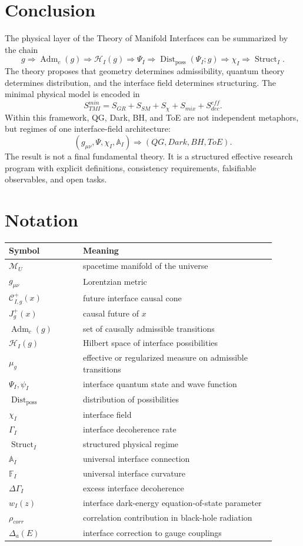 \documentclass[12pt,a4paper]{article}
\DeclareMathOperator{\Adm}{Adm}
\DeclareMathOperator{\Struct}{Struct}
\DeclareMathOperator{\Dist}{Dist}
\newcommand{\M}{\mathcal M_U}
\newcommand{\Hilb}{\mathcal H}
\newcommand{\Acal}{\mathbb A_I}
\newcommand{\Fcal}{\mathbb F_I}
\begin{document}
\section{Conclusion}
The physical layer of the Theory of Manifold Interfaces can be summarized by the chain
\[
\boxed{
g\Rightarrow\Adm_c(g)\Rightarrow\Hilb_I(g)\Rightarrow\Psi_I
\Rightarrow\Dist_{\mathrm{poss}}(\Psi_I;g)
\Rightarrow\chi_I\Rightarrow\Struct_I.
}
\]
The theory proposes that geometry determines admissibility, quantum theory determines distribution, and the interface field determines structuring. The minimal physical model is encoded in
\[
\boxed{
S_{TMI}^{min}=S_{GR}+S_{SM}+S_\chi+S_{mix}+S_{dec}^{eff}.
}
\]
Within this framework, QG, Dark, BH, and ToE are not independent metaphors, but regimes of one interface-field architecture:
\[
\boxed{(g_{\mu\nu},\Psi,\chi_I,\Acal)\Rightarrow(QG,Dark,BH,ToE).}
\]
The result is not a final fundamental theory. It is a structured effective research program with explicit definitions, consistency requirements, falsifiable observables, and open tasks.

\appendix
\section{Notation}
\begin{longtable}{p{0.25\linewidth}p{0.65\linewidth}}
\toprule
Symbol & Meaning \\
\midrule
$\M$ & spacetime manifold of the universe \\
$g_{\mu\nu}$ & Lorentzian metric \\
$\mathcal C^+_{I,g}(x)$ & future interface causal cone \\
$J_g^+(x)$ & causal future of $x$ \\
$\Adm_c(g)$ & set of causally admissible transitions \\
$\Hilb_I(g)$ & Hilbert space of interface possibilities \\
$\mu_g$ & effective or regularized measure on admissible transitions \\
$\Psi_I,\psi_I$ & interface quantum state and wave function \\
$\Dist_{\mathrm{poss}}$ & distribution of possibilities \\
$\chi_I$ & interface field \\
$\Gamma_I$ & interface decoherence rate \\
$\Struct_I$ & structured physical regime \\
$\Acal$ & universal interface connection \\
$\Fcal$ & universal interface curvature \\
$\Delta\Gamma_I$ & excess interface decoherence \\
$w_I(z)$ & interface dark-energy equation-of-state parameter \\
$\rho_{corr}$ & correlation contribution in black-hole radiation \\
$\Delta_a(E)$ & interface correction to gauge couplings \\
\bottomrule
\end{longtable}
\end{document}
